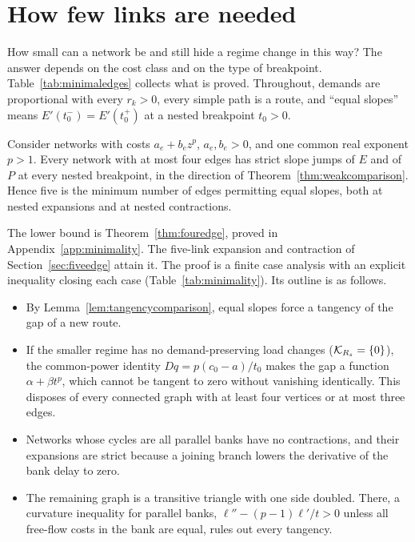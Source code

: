 \section{How few links are needed}\label{sec:minimal}

How small can a network be and still hide a regime change in this way? The answer depends on the cost class and on the type of breakpoint. Table~\ref{tab:minimaledges} collects what is proved. Throughout, demands are proportional with every $r_k>0$, every simple path is a route, and ``equal slopes'' means $E'(t_0^-)=E'(t_0^+)$ at a nested breakpoint $t_0>0$.

\begin{theorem}\label{thm:minimal}
Consider networks with costs $a_e+b_ez^p$, $a_e,b_e>0$, and one common real exponent $p>1$. Every network with at most four edges has strict slope jumps of $E$ and of $P$ at every nested breakpoint, in the direction of Theorem~\ref{thm:weakcomparison}. Hence five is the minimum number of edges permitting equal slopes, both at nested expansions and at nested contractions.
\end{theorem}

The lower bound is Theorem~\ref{thm:fouredge}, proved in Appendix~\ref{app:minimality}. The five-link expansion and contraction of Section~\ref{sec:fiveedge} attain it. The proof is a finite case analysis with an explicit inequality closing each case (Table~\ref{tab:minimality}). Its outline is as follows.
\begin{itemize}[nosep]
\item By Lemma~\ref{lem:tangencycomparison}, equal slopes force a tangency of the gap of a new route.
\item If the smaller regime has no demand-preserving load changes ($\mathcal K_{R_s}=\{0\}$), the common-power identity $Dq=p(c_0-a)/t_0$ makes the gap a function $\alpha+\beta t^p$, which cannot be tangent to zero without vanishing identically. This disposes of every connected graph with at least four vertices or at most three edges.
\item Networks whose cycles are all parallel banks have no contractions, and their expansions are strict because a joining branch lowers the derivative of the bank delay to zero.
\item The remaining graph is a transitive triangle with one side doubled. There, a curvature inequality for parallel banks, $\ell''-(p-1)\ell'/t>0$ unless all free-flow costs in the bank are equal, rules out every tangency.
\end{itemize}

